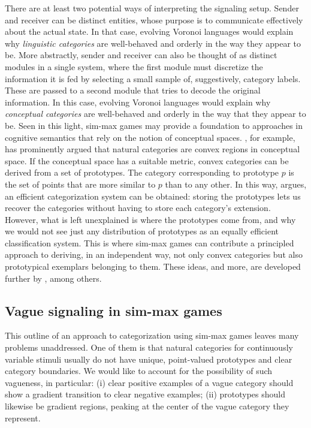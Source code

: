 \documentclass[fleqn,reqno,10pt]{article}
\begin{document}
There are at least two potential ways of interpreting the signaling setup.
Sender and receiver can be distinct
entities, whose purpose is to communicate effectively about the actual
state. In that case, evolving Voronoi languages would explain why
\emph{linguistic categories} are well-behaved and orderly in the way
they appear to be. More abstractly, sender and receiver can also be
thought of as distinct modules in a single system, where the first
module must discretize the information it is fed by selecting a small
sample of, suggestively, category labels. These are passed to a second
module that tries to decode the original information. In this case,
evolving Voronoi languages would explain why \emph{conceptual
  categories} are well-behaved and orderly in the way that they appear
to be.
Seen in this light, sim-max games may provide a foundation to approaches in cognitive semantics
that rely on the notion of conceptual spaces.
\citet[][70--77]{Gardenfors2000:Conceptual-Spac}, for example, has prominently argued that
natural categories are convex regions in conceptual space. If the conceptual space has a
suitable metric, convex categories can be derived from a set of prototypes. The category
corresponding to prototype $p$ is the set of points that are more similar to $p$ than to any
other. In this way, \citeauthor{Gardenfors2000:Conceptual-Spac} argues, an efficient categorization
system can be obtained: storing the prototypes lets us recover the categories without having to
store each category's extension. However, what is left unexplained is where the prototypes
come from, and why we would not see just any distribution of prototypes as an equally efficient
classification system. This is where sim-max games can contribute a principled approach to
deriving, in an independent way, not only convex categories but also prototypical exemplars
belonging to them.  These ideas, and more, are developed further by
\citet{Jager2007:The-Evolution-o,JagerRooijvan-Rooij2007:Language-Struct,JagerMetzger2011:Voronoi-Languag,OConnor2014-OCOEPC},
among others.

\subsection{Vague signaling in sim-max games}

This outline of an approach to categorization using sim-max games
leaves many problems unaddressed. One of them is that natural
categories for continuously variable stimuli usually do not have
unique, point-valued prototypes and clear category boundaries. We
would like to account for the possibility of such vagueness, in
particular: (i) clear positive examples of a vague category should
show a gradient transition to clear negative examples;
(ii) prototypes should likewise be gradient regions, peaking at the
center of the vague category they represent.
\end{document}
